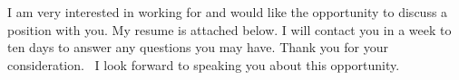 \documentclass{my_cv}
\begin{document}
I am very interested in working for \companyName and would like the
opportunity to discuss a position with you.  My resume is attached
below.  I will contact you in a week to ten days to answer any questions
you may have. Thank you for your consideration.   I look forward to
speaking you about this opportunity. 

\makeletterclosing
\end{document}
